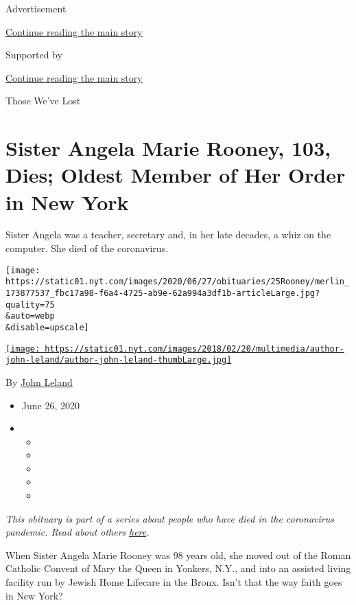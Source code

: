 Advertisement

\protect\hyperlink{after-top}{Continue reading the main story}

Supported by

\protect\hyperlink{after-sponsor}{Continue reading the main story}

Those We've Lost

\hypertarget{sister-angela-marie-rooney-103-dies-oldest-member-of-her-order-in-new-york}{%
\section{Sister Angela Marie Rooney, 103, Dies; Oldest Member of Her
Order in New
York}\label{sister-angela-marie-rooney-103-dies-oldest-member-of-her-order-in-new-york}}

Sister Angela was a teacher, secretary and, in her late decades, a whiz
on the computer. She died of the coronavirus.

\texttt{[image: https://static01.nyt.com/images/2020/06/27/obituaries/25Rooney/merlin\_173877537\_fbc17a98-f6a4-4725-ab9e-62a994a3df1b-articleLarge.jpg?quality=75\\\&auto=webp\\\&disable=upscale]}

\href{https://www.nytimes.com/by/john-leland}{\texttt{[image: https://static01.nyt.com/images/2018/02/20/multimedia/author-john-leland/author-john-leland-thumbLarge.jpg]}}

By \href{https://www.nytimes.com/by/john-leland}{John Leland}

\begin{itemize}
\item
  June 26, 2020
\item
  \begin{itemize}
  \item
  \item
  \item
  \item
  \item
  \end{itemize}
\end{itemize}

\emph{This obituary is part of a series about people who have died in
the coronavirus pandemic. Read about others}
\href{https://www.nytimes.com/interactive/2020/obituaries/people-died-coronavirus-obituaries.html}{\emph{here}}\emph{.}

When Sister Angela Marie Rooney was 98 years old, she moved out of the
Roman Catholic Convent of Mary the Queen in Yonkers, N.Y., and into an
assisted living facility run by Jewish Home Lifecare in the Bronx. Isn't
that the way faith goes in New York?

